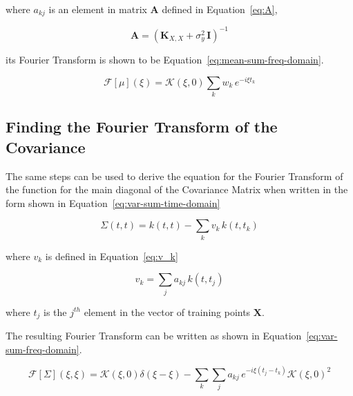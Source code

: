 \documentclass[12pt]{article}
\begin{document}
    \noindent where $a_{kj}$ is an element in matrix $\mathbf{A}$ defined in Equation~\ref{eq:A},

    \begin{equation}
         \mathbf{A} = (\mathbf{K}_{X,X} + \sigma^2_y \, \mathbf{I})^{-1} \label{eq:A}
    \end{equation}

    \noindent its Fourier Transform is shown to be Equation~\ref{eq:mean-sum-freq-domain}.

    \begin{equation}
        \mathcal{F}[{\mu}](\xi) = \mathcal{K}(\xi,0) \sum_k w_k \, e^{- i \xi t_k} \label{eq:mean-sum-freq-domain}
    \end{equation}

    \subsection{Finding the Fourier Transform of the Covariance}

    The same steps can be used to derive the equation for the Fourier Transform of the function for the main diagonal of the Covariance Matrix when written in the form shown in Equation~\ref{eq:var-sum-time-domain}

    \begin{equation}
        \Sigma(t, t) = k(t,t) - \sum_k v_k \, k(t,t_k) \label{eq:var-sum-time-domain}
    \end{equation}

    \noindent where $v_k$ is defined in Equation~\ref{eq:v_k}

    \begin{equation}
        v_k = \sum_j a_{kj} \, k(t,t_j) \label{eq:v_k}
    \end{equation}

    \noindent where $t_j$ is the $j^{th}$ element in the vector of training points $\mathbf{X}$.

    The resulting Fourier Transform can be written as shown in Equation~\ref{eq:var-sum-freq-domain}.


    \begin{equation}
        \mathcal{F}[\Sigma](\xi, \xi) = \mathcal{K}(\xi,0) \delta(\xi - \xi)  - \sum_k \sum_j a_{kj} \, e^{-i \xi (t_j - t_k)} \mathcal{K}(\xi,0)^2 \label{eq:var-sum-freq-domain}
    \end{equation}
\end{document}
